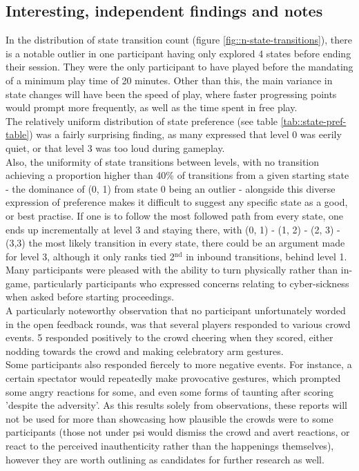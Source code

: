 \subsection{Interesting, independent findings and notes}

In the distribution of state transition count (figure \ref{fig::n-state-transitions}), there is a notable outlier in one participant having only explored 4 states before ending their session. They were the only participant to have played before the mandating of a minimum play time of 20 minutes. Other than this, the main variance in state changes will have been the speed of play, where faster progressing points would prompt more frequently, as well as the time spent in free play.\\

The relatively uniform distribution of state preference (see table \ref{tab::state-pref-table}) was a fairly surprising finding, as many expressed that level 0 was eerily quiet, or that level 3 was too loud during gameplay.\\
Also, the uniformity of state transitions between levels, with no transition achieving a proportion higher than 40\% of transitions from a given starting state - the dominance of (0, 1) from state 0 being an outlier - alongside this diverse expression of preference makes it difficult to suggest any specific state as a good, or best practise. If one is to follow the most followed path from every state, one ends up incrementally at level 3 and staying there, with (0, 1) - (1, 2) - (2, 3) - (3,3) the most likely transition in every state, there could be an argument made for level 3, although it only ranks tied 2$^{\text{nd}}$ in inbound transitions, behind level 1.\\

Many participants were pleased with the ability to turn physically rather than in-game, particularly participants who expressed concerns relating to cyber-sickness when asked before starting proceedings.\\

A particularly noteworthy observation that no participant unfortunately worded in the open feedback rounds, was that several players responded to various crowd events. 5 responded positively to the crowd cheering when they scored, either nodding towards the crowd and making celebratory arm gestures.\\
Some participants also responded fiercely to more negative events. For instance, a certain spectator would repeatedly make provocative gestures, which prompted some angry reactions for some, and even some forms of taunting after scoring 'despite the adversity'. As this results solely from observations, these reports will not be used for more than showcasing how plausible the crowds were to some participants (those not under \gls{psi} would dismiss the crowd and avert reactions, or react to the perceived inauthenticity rather than the happenings themselves), however they are worth outlining as candidates for further research as well.

